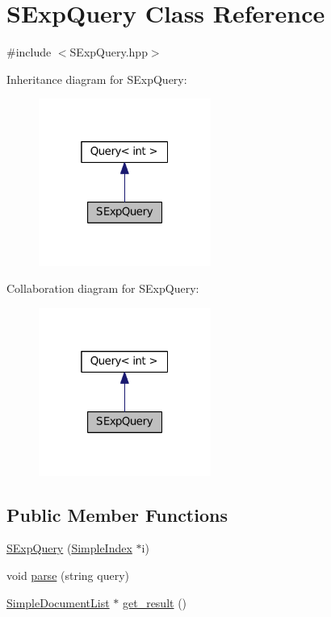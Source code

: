 \hypertarget{class_s_exp_query}{\section{S\-Exp\-Query Class Reference}
\label{class_s_exp_query}
}


{\ttfamily \#include $<$S\-Exp\-Query.\-hpp$>$}



Inheritance diagram for S\-Exp\-Query\-:\nopagebreak
\begin{figure}[H]
\begin{center}
\leavevmode
\includegraphics[width=160pt]{class_s_exp_query__inherit__graph}
\end{center}
\end{figure}


Collaboration diagram for S\-Exp\-Query\-:\nopagebreak
\begin{figure}[H]
\begin{center}
\leavevmode
\includegraphics[width=160pt]{class_s_exp_query__coll__graph}
\end{center}
\end{figure}
\subsection*{Public Member Functions}
\begin{DoxyCompactItemize}
\item 
\hyperlink{class_s_exp_query_a990f906c78b84672e089dd2207cd2498}{S\-Exp\-Query} (\hyperlink{class_simple_index}{Simple\-Index} $\ast$i)
\item 
void \hyperlink{class_s_exp_query_a38bc807bf8216b6a9530128280cf709f}{parse} (string query)
\item 
\hyperlink{class_simple_document_list}{Simple\-Document\-List} $\ast$ \hyperlink{class_s_exp_query_a6e413aa8c2d5dc6d7d32682028543b38}{get\-\_\-result} ()
\end{DoxyCompactItemize}


